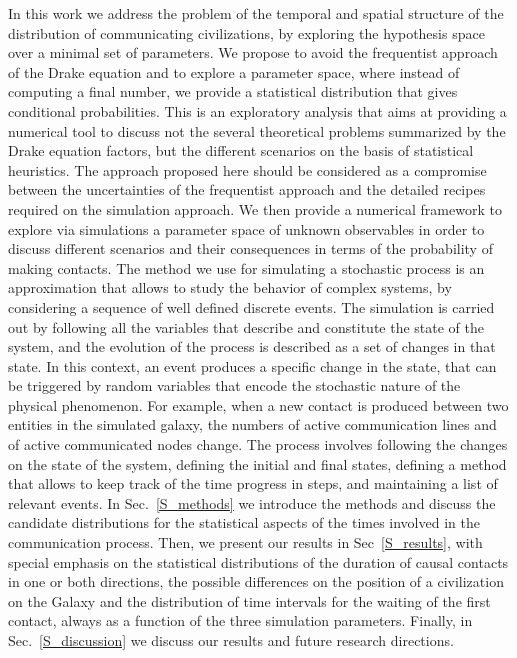 In this work we address the problem of the temporal and spatial
structure of the distribution of communicating civilizations, by
exploring the hypothesis space over a minimal set of parameters.
%
We propose to avoid the frequentist approach of the
Drake equation and to explore a parameter space, where instead of
computing a final number, we provide a statistical distribution that
gives conditional probabilities.
%
This is an exploratory analysis that aims at providing a numerical
tool to discuss not the several theoretical problems summarized by the
Drake equation factors, but the different scenarios on the basis of
statistical heuristics.
%
The approach proposed here should be considered as a compromise
between the uncertainties of the frequentist approach and the detailed
recipes required on the simulation approach.
%
We then provide a numerical framework to explore via simulations a
parameter space of unknown observables in order to discuss different
scenarios and their consequences in terms of the probability of
making contacts.
%
The method we use for simulating a stochastic process is an
approximation that allows to study the behavior of complex systems,
by considering a sequence of well defined discrete events.
%
The simulation is carried out by following all the variables that
describe and constitute the state of the system, and the evolution of
the process is described as a set of changes in that state.
%
In this context, an event produces a specific change in the state,
that can be triggered by random variables that encode the stochastic
nature of the physical phenomenon.
%
For example, when a new contact is produced between two entities in
the simulated galaxy, the numbers of active communication lines and of
active communicated nodes change.
%
The process involves following the changes on the state of the
system, defining the initial and final states, defining a method that
allows to keep track of the time progress in steps, and maintaining a
list of relevant events.
%
In Sec.~\ref{S_methods} we introduce the methods and discuss the
candidate distributions for the statistical aspects of the times
involved in the communication process.
%
Then, we present our results in Sec~\ref{S_results}, with special
emphasis on the statistical distributions of the duration of causal
contacts in one or both directions, the possible differences on the
position of a civilization on the Galaxy and the distribution of time
intervals for the waiting of the first contact, always as a function
of the three simulation parameters.
%
Finally, in Sec.~\ref{S_discussion} we discuss our results and future
research directions.


